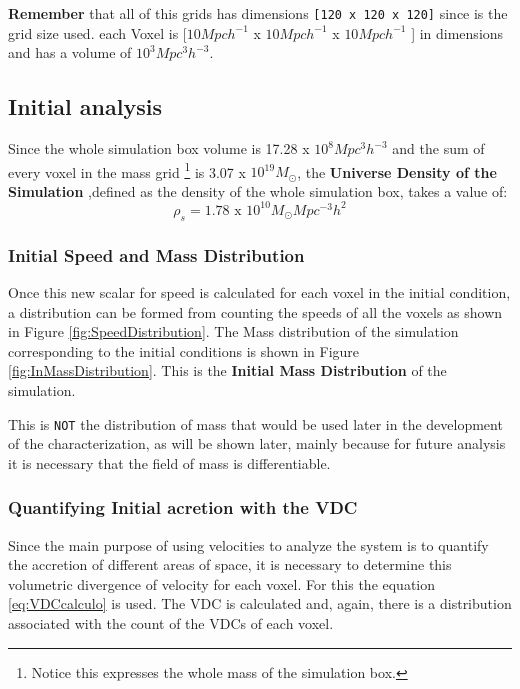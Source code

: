\documentclass[a4paper,fleqn,usenatbib]{mnras}
\begin{document}
\textbf{Remember} that all of this grids has dimensions \texttt{[120 x 120 x 120]} since is the grid size used. each Voxel is [$10 Mpc h^{-1}$ x $10 Mpc h^{-1}$ x $10 Mpc h^{-1}$ ] in dimensions and has a volume of $10^3 Mpc^{3}h^{-3}$.

\subsection{Initial analysis}
\label{sec:initanalysis}
Since the whole simulation box volume is 17.28 x $10^{8} Mpc^{3}h^{-3}$ and the sum of every voxel in the mass grid \footnote{Notice this expresses the whole mass of the simulation box.} is 3.07 x $10^{19} M_{\odot}$, the \textbf{Universe Density of the Simulation} ,defined as the density of the whole simulation box, takes a value of:
\begin{equation}
    \rho_{s} = 1.78\text{ x }10^{10} M_{\odot} Mpc^{-3} h^{2}
\label{eq:UNI}
\end{equation}
\subsubsection{Initial Speed and Mass Distribution}


Once this new scalar for speed is calculated for each voxel in the initial condition, a distribution can be formed from counting the  speeds of all the voxels as shown in Figure \ref{fig:SpeedDistribution}. The Mass distribution of the simulation corresponding to the initial conditions is shown in Figure \ref{fig:InMassDistribution}. This is the \textbf{Initial Mass Distribution} of the simulation. 

This is \texttt{NOT} the distribution of mass that would be used later in the development of the characterization, as will be shown later, mainly because for future analysis it is necessary that the field of mass is differentiable.


\subsubsection{Quantifying Initial acretion with the VDC} \label{sec:VDCquantifyingResults}
Since the main purpose of using velocities to analyze the system is to quantify the accretion of different areas of space, it is necessary to determine this volumetric divergence of velocity for each voxel. For this the equation \ref{eq:VDCcalculo} is used. The VDC is calculated and, again, there is a distribution associated with the count of the VDCs of each voxel.
\end{document}
